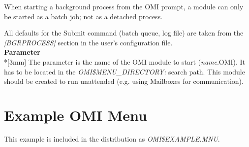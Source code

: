 \documentclass[a4paper]{book}
\newcommand{\vs}{\vspace{3mm}}
\begin{document}
When starting a background process from the OMI prompt, a module can only be 
started as a batch job; not as a detached process. 

\vs

All defaults for the Submit command (batch queue, log file) are taken from 
the \textsl{[BGRPROCESS]} section in the user's configuration file.\\[3mm]
\textbf{Parameter}\\*[3mm]
The parameter is the name of the OMI module to start (\textit{name}.OMI). It has to be 
located in the \textsl{OMI{\$}MENU{\_}DIRECTORY:} search path. This module should be 
created to run unattended (e.g. using Mailboxes for communication).


\appendix
\chapter{Example OMI Menu}

This example is included in the distribution as \textsl{OMI{\$}EXAMPLE.MNU}.
\end{document}
